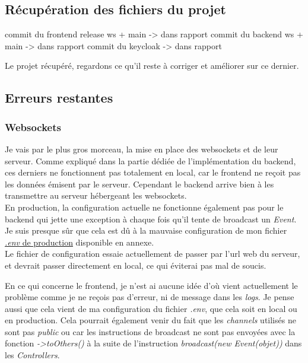 \documentclass[
    iai, %
    il, %
]{heig-tb}
\begin{document}
\subsection{Récupération des fichiers du projet}
commit du \Gls{frontend} release ws + main -> dans rapport %
commit du \Gls{backend} ws + main -> dans rapport %
commit du keycloak -> dans rapport %

Le projet récupéré, regardons ce qu'il reste à corriger et améliorer sur ce dernier.

\subsection{Erreurs restantes}

\subsubsection{Websockets}
Je vais par le plus gros morceau, la mise en place des \Gls{websockets} et de leur serveur.
Comme expliqué dans la partie dédiée de l'implémentation du \Gls{backend}, ces derniers ne fonctionnent pas totalement en local, car le \Gls{frontend} ne reçoit pas les données émisent par le serveur. Cependant le \Gls{backend} arrive bien à les transmettre au serveur hébergeant les \Gls{websockets}. \\
En production, la configuration actuelle ne fonctionne également pas pour le \Gls{backend} qui jette une exception à chaque fois qu'il tente de \Gls{broadcast} un \emph{Event}. Je suis presque sûr que cela est dû à la mauvaise configuration de mon fichier \href{https://github.com/heig-fablab/fablab-manager/blob/main/.env.prod.example}{\emph{.env} de production} disponible en annexe. \\
Le fichier de configuration essaie actuellement de passer par l'\Gls{url} web du serveur, et devrait passer directement en local, ce qui éviterai pas mal de soucis.

En ce qui concerne le \Gls{frontend}, je n'est ai aucune idée d'où vient actuellement le problème comme je ne reçois pas d'erreur, ni de message dans les \emph{logs}.
Je pense aussi que cela vient de ma configuration du fichier \emph{.env}, que cela soit en local ou en production.
Cela pourrait également venir du fait que les \emph{channels} utilisés ne sont pas \emph{public} ou car les instructions de \Gls{broadcast} ne sont pas envoyées avec la fonction \emph{->toOthers()} à la suite de l'instruction \emph{broadcast(new Event(objet))} dans les \emph{Controllers}. \\
\end{document}

